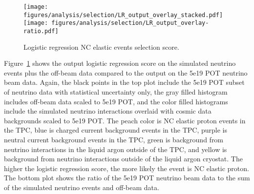     \begin{figure}[ht]
      \centering
      \texttt{[image: figures/analysis/selection/LR\_output\_overlay\_stacked.pdf]} \\
      \texttt{[image: figures/analysis/selection/LR\_output\_overlay-ratio.pdf]}
      \caption{Logistic regression NC elastic events selection score.}
      \label{fig:lroutput}
    \end{figure}
    Figure~\ref{fig:lroutput} shows the output logistic regression score on the
    simulated neutrino events plus the off-beam data compared to the output on
    the 5e19 POT neutrino beam data. Again, the black points in the top plot
    include the 5e19 POT subset of neutrino data with statistical uncertainty
    only, the gray filled histogram includes off-beam data scaled to 5e19 POT,
    and the color filled histograms include the simulated neutrino interactions
    overlaid with cosmic data backgrounds scaled to 5e19 POT. The peach color
    is NC elastic proton events in the TPC, blue is charged current background
    events in the TPC, purple is neutral current background events in the TPC,
    green is background from neutrino interactions in the liquid argon outside
    of the TPC, and yellow is background from neutrino interactions outside of
    the liquid argon cryostat. The higher the logistic regression score, the
    more likely the event is NC elastic proton. The bottom plot shows the ratio
    of the 5e19 POT neutrino beam data to the sum of the simulated neutrino
    events and off-beam data.
    
